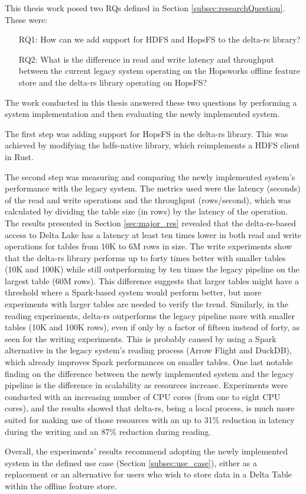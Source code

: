 This thesis work posed two \glspl{RQ} defined in Section \ref{subsec:researchQuestion}. These were: 
\begin{enumerate}
    \item[RQ1:] How can we add support for \gls{HDFS} and \gls{HopsFS} to the delta-rs library?
    \item[RQ2:] What is the difference in read and write latency and throughput between the current legacy system operating on the Hopsworks offline feature store and the delta-rs library operating on HopsFS?
\end{enumerate}
The work conducted in this thesis answered these two questions by performing a system implementation and then evaluating the newly implemented system. 

The first step was adding support for \gls{HopsFS} in the delta-rs library. This was achieved by modifying the hdfs-native library, which reimplements a \gls{HDFS} client in Rust. 

The second step was measuring and comparing the newly implemented system's performance with the legacy system. The metrics used were the latency (seconds) of the read and write operations and the throughput (rows/second), which was calculated by dividing the table size (in rows) by the latency of the operation. The results presented in Section \ref{sec:major_res} revealed that the delta-rs-based access to Delta Lake has a latency at least ten times lower in both read and write operations for tables from 10K to 6M rows in size. The write experiments show that the delta-rs library performs up to forty times better with smaller tables (10K and 100K) while still outperforming by ten times the legacy pipeline on the largest table (60M rows). This difference suggests that larger tables might have a threshold where a Spark-based system would perform better, but more experiments with larger tables are needed to verify the trend.
Similarly, in the reading experiments, delta-rs outperforms the legacy pipeline more with smaller tables (10K and 100K rows), even if only by a factor of fifteen instead of forty, as seen for the writing experiments. This is probably caused by using a Spark alternative in the legacy system's reading process (Arrow Flight and DuckDB), which already improves Spark performances on smaller tables. One last notable finding on the difference between the newly implemented system and the legacy pipeline is the difference in scalability as resources increase. Experiments were conducted with an increasing number of \gls{CPU} cores (from one to eight \gls{CPU} cores), and the results showed that delta-rs, being a local process, is much more suited for making use of those resources with an up to 31\% reduction in latency during the writing and an 87\% reduction during reading.

Overall, the experiments' results recommend adopting the newly implemented system in the defined use case (Section \ref{subsec:use_case}), either as a replacement or an alternative for users who wish to store data in a Delta Table within the offline feature store.
